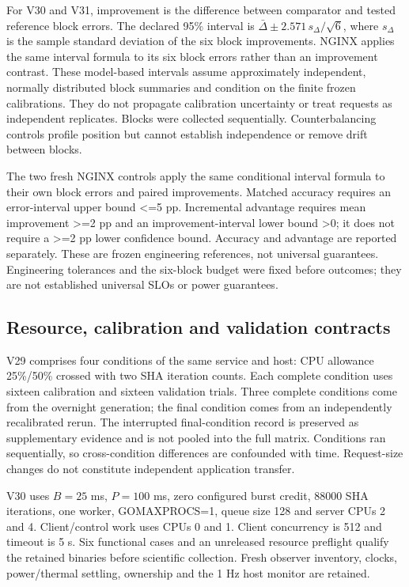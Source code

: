 \documentclass[11pt,a4paper]{article}
\begin{document}
For V30 and V31, improvement is the difference between comparator and tested
reference block errors. The declared 95\% interval is
$\bar\Delta \pm 2.571\,s_\Delta/\sqrt{6}$, where $s_\Delta$ is the sample
standard deviation of the six block improvements. NGINX applies the same interval
formula to its six block errors rather than an improvement contrast. These
model-based intervals assume approximately independent, normally distributed
block summaries and condition on the finite frozen calibrations. They do not
propagate calibration uncertainty or treat requests as independent replicates.
Blocks were collected sequentially. Counterbalancing controls profile position
but cannot establish independence or remove drift between blocks.

The two fresh NGINX controls apply the same conditional interval formula to
their own block errors and paired improvements. Matched accuracy requires an
error-interval upper bound <=5 pp. Incremental advantage requires mean
improvement >=2 pp and an improvement-interval lower bound >0; it does not
require a >=2 pp lower confidence bound. Accuracy and advantage are reported
separately. These are frozen engineering references, not universal guarantees.
Engineering tolerances and the six-block budget were fixed before outcomes;
they are not established universal SLOs or power guarantees.

\subsection{Resource, calibration and validation contracts}

V29 comprises four conditions of the same service and host: CPU allowance
25\%/50\% crossed with two SHA iteration counts. Each complete condition uses
sixteen calibration and sixteen validation trials. Three complete conditions
come from the overnight generation; the final condition comes from an
independently recalibrated rerun. The interrupted final-condition record is
preserved as supplementary evidence and is not pooled into the full matrix.
Conditions ran sequentially, so cross-condition differences are confounded
with time. Request-size changes do not constitute independent application
transfer.

V30 uses $B=25$ ms, $P=100$ ms, zero configured burst credit, 88000 SHA iterations,
one worker, GOMAXPROCS=1, queue size 128 and server CPUs 2 and 4. Client/control
work uses CPUs 0 and 1. Client concurrency is 512 and timeout is 5 s. Six
functional cases and an unreleased resource preflight qualify the retained
binaries before scientific collection. Fresh observer inventory, clocks,
power/thermal settling, ownership and the 1 Hz host monitor are retained.
\end{document}
